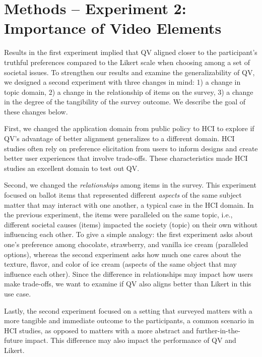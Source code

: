 \section{Methods -- Experiment 2: Importance of Video Elements}
\label{method-2}
Results in the first experiment implied that QV aligned closer to the participant's truthful preferences compared to the Likert scale when choosing among a set of societal issues. To strengthen our results and examine the generalizability of QV, we designed a second experiment with three changes in mind: 1) a change in topic domain, 2) a change in the relationship of items on the survey, 3) a change in the degree of the tangibility of the survey outcome. We describe the goal of these changes below.

First, we changed the application domain from public policy to HCI to explore if QV's advantage of better alignment generalizes to a different domain. HCI studies often rely on preference elicitation from users to inform designs and create better user experiences that involve trade-offs. These characteristics made HCI studies an excellent domain to test out QV. 

Second, we changed the \textit{relationships} among items in the survey. This experiment focused on ballot items that represented different \textit{aspects} of the same subject matter that may interact with one another, a typical case in the HCI domain. In the previous experiment, the items were paralleled on the same topic, i.e., different societal causes (items) impacted the society (topic) on their own without influencing each other. To give a simple analogy: the first experiment asks about one's preference among chocolate, strawberry, and vanilla ice cream (paralleled options), whereas the second experiment asks how much one cares about the texture, flavor, and color of ice cream (aspects of the same object that may influence each other). Since the difference in relationships may impact how users make trade-offs, we want to examine if QV also aligns better than Likert in this use case.

Lastly, the second experiment focused on a setting that surveyed matters with a more tangible and immediate outcome to the participants, a common scenario in HCI studies, as opposed to matters with a more abstract and further-in-the-future impact. This difference may also impact the performance of QV and Likert. 

